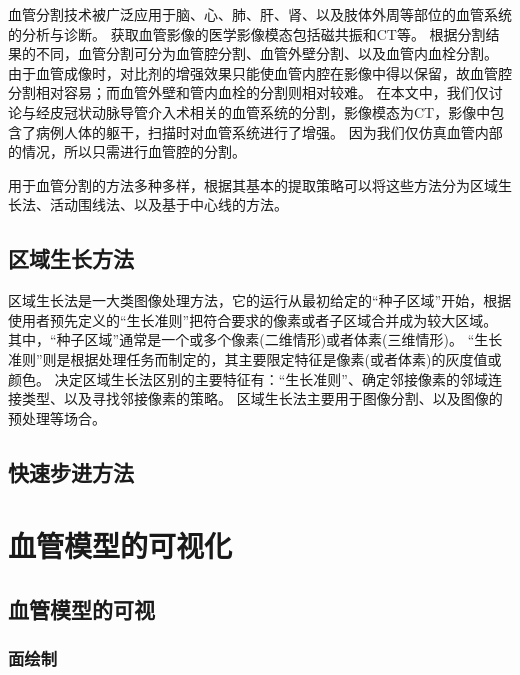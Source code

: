 血管分割技术被广泛应用于脑、心、肺、肝、肾、以及肢体外周等部位的血管系统的分析与诊断。
获取血管影像的医学影像模态包括磁共振和CT等。
根据分割结果的不同，血管分割可分为血管腔分割、血管外壁分割、以及血管内血栓分割\cite{Lesage2009Review}。
由于血管成像时，对比剂的增强效果只能使血管内腔在影像中得以保留，故血管腔分割相对容易；而血管外壁和管内血栓的分割则相对较难。
在本文中，我们仅讨论与经皮冠状动脉导管介入术相关的血管系统的分割，影像模态为CT，影像中包含了病例人体的躯干，扫描时对血管系统进行了增强。
因为我们仅仿真血管内部的情况，所以只需进行血管腔的分割。

用于血管分割的方法多种多样，根据其基本的提取策略可以将这些方法分为区域生长法、活动围线法、以及基于中心线的方法。

\subsection{区域生长方法}

区域生长法是一大类图像处理方法，它的运行从最初给定的“种子区域”开始，根据使用者预先定义的“生长准则”把符合要求的像素或者子区域合并成为较大区域。
其中，“种子区域”通常是一个或多个像素(二维情形)或者体素(三维情形)。
“生长准则”则是根据处理任务而制定的，其主要限定特征是像素(或者体素)的灰度值或颜色\cite{Gonzalez2004Matlab}。
决定区域生长法区别的主要特征有：“生长准则”、确定邻接像素的邻域连接类型、以及寻找邻接像素的策略\cite{Ibanez2005ITKGuide}。
区域生长法主要用于图像分割、以及图像的预处理等场合。

\subsection{快速步进方法}

\cite{Sethian1996FastMarching} \cite{Osher1988LevelSet}


\section{血管模型的可视化}

\subsection{血管模型的可视}

\subsubsection{面绘制}

